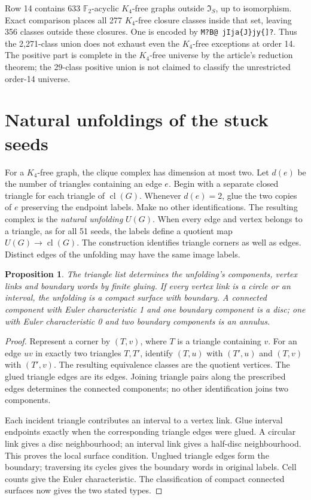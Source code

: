 \documentclass[11pt]{amsart}
\newcommand{\IS}{\mathfrak I_S}
\newcommand{\cl}{\operatorname{cl}}
\newtheorem{proposition}[theorem]{Proposition}
\theoremstyle{definition}
\begin{document}
Row 14 contains 633 $\mathbb F_2$-acyclic $K_4$-free graphs outside
$\IS$, up to isomorphism.
Exact comparison places all 277 $K_4$-free closure classes inside
that set, leaving 356 classes outside these closures. One is encoded
by \texttt{M?B@ jIja\{J\}jy\{]?}.
Thus the 2,271-class union does not exhaust even the $K_4$-free
exceptions at order 14.
The positive part is complete in the $K_4$-free universe by the
article's reduction theorem; the 29-class positive union is not claimed
to classify the unrestricted order-14 universe.

\section{Natural unfoldings of the stuck seeds}\label{sec:unfold}
For a $K_4$-free graph, the clique complex has dimension at most two.
Let $d(e)$ be the number of triangles containing an edge $e$.
Begin with a separate closed triangle for each triangle of $\cl(G)$.
Whenever $d(e)=2$, glue the two copies of $e$ preserving the endpoint
labels. Make no other identifications. The resulting complex is the
\emph{natural unfolding} $U(G)$.
When every edge and vertex belongs to a triangle, as for all 51 seeds,
the labels define a quotient map $U(G)\to\cl(G)$.
The construction identifies triangle corners as well as edges.
Distinct edges of the unfolding may have the same image labels.

\begin{proposition}\label{prop:unfold}
The triangle list determines the unfolding's components, vertex links
and boundary words by finite gluing.
If every vertex link is a circle or an interval, the unfolding is a
compact surface with boundary. A connected component with Euler
characteristic 1 and one boundary component is a disc; one with Euler
characteristic 0 and two boundary components is an annulus.
\end{proposition}
\begin{proof}
Represent a corner by $(T,v)$, where $T$ is a triangle containing $v$.
For an edge $uv$ in exactly two triangles $T,T'$, identify
$(T,u)$ with $(T',u)$ and $(T,v)$ with $(T',v)$.
The resulting equivalence classes are the quotient vertices.
The glued triangle edges are its edges. Joining triangle pairs along
the prescribed edges determines the connected components; no other
identification joins two components.

Each incident triangle contributes an interval to a vertex link.
Glue interval endpoints exactly when the corresponding triangle
edges were glued. A circular link gives a disc neighbourhood; an
interval link gives a half-disc neighbourhood. This proves the local
surface condition. Unglued triangle edges form the boundary;
traversing its cycles gives the boundary words in original labels.
Cell counts give the Euler characteristic.
The classification of compact connected surfaces now gives the
two stated types.
\end{proof}
\end{document}
